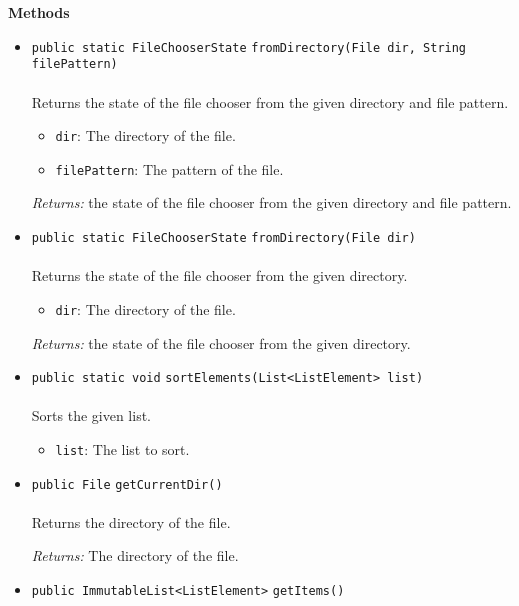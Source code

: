 \textbf{\sffamily Methods}
\begin{itemize}
\item \lstinline|public static FileChooserState| \lstinline|fromDirectory|\lstinline|(File dir, String filePattern)|\\ \\[-0.6em]
Returns the state of the file chooser from the given directory and file pattern.
\begin{itemize}
\item \lstinline|dir|: The directory of the file.
\item \lstinline|filePattern|: The pattern of the file.
\end{itemize}

\emph{Returns:} the state of the file chooser from the given directory and file pattern.

\item \lstinline|public static FileChooserState| \lstinline|fromDirectory|\lstinline|(File dir)|\\ \\[-0.6em]
Returns the state of the file chooser from the given directory.
\begin{itemize}
\item \lstinline|dir|: The directory of the file.
\end{itemize}

\emph{Returns:} the state of the file chooser from the given directory.

\item \lstinline|public static void| \lstinline|sortElements|\lstinline|(List<ListElement> list)|\\ \\[-0.6em]
Sorts the given list.
\begin{itemize}
\item \lstinline|list|: The list to sort.
\end{itemize}



\item \lstinline|public File| \lstinline|getCurrentDir|\lstinline|()|\\ \\[-0.6em]
Returns the directory of the file.

\emph{Returns:} The directory of the file.

\item \lstinline|public ImmutableList<ListElement>| \lstinline|getItems|\lstinline|()| \\[-0.6em]




\end{itemize}

